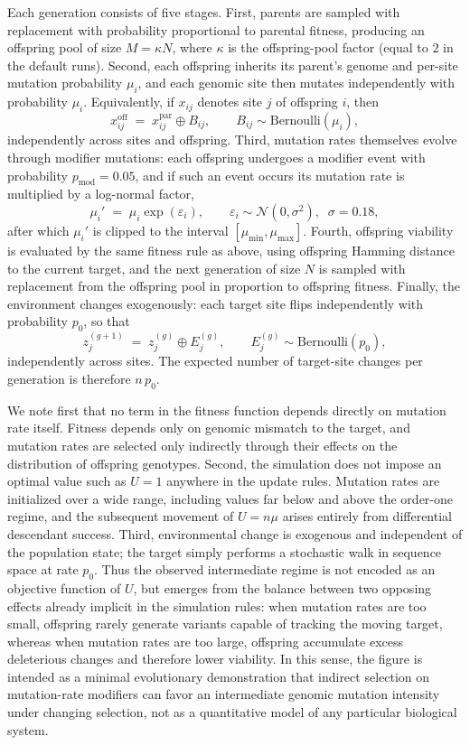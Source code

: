 {Each generation consists of five stages. First, parents are sampled with replacement with probability proportional to parental fitness, producing an offspring pool of size $M=\kappa N$, where $\kappa$ is the offspring-pool factor (equal to $2$ in the default runs). Second, each offspring inherits its parent’s genome and per-site mutation probability $\mu_i$, and each genomic site then mutates independently with probability $\mu_i$. Equivalently, if $x_{ij}$ denotes site $j$ of offspring $i$, then
\[
x_{ij}^{\mathrm{off}} \;=\; x_{ij}^{\mathrm{par}} \oplus B_{ij},
\qquad
B_{ij}\sim \mathrm{Bernoulli}(\mu_i),
\]
independently across sites and offspring. Third, mutation rates themselves evolve through modifier mutations: each offspring undergoes a modifier event with probability $p_{\mathrm{mod}}=0.05$, and if such an event occurs its mutation rate is multiplied by a log-normal factor,
\[
\mu_i' \;=\; \mu_i \exp(\varepsilon_i),
\qquad
\varepsilon_i \sim \mathcal N(0,\sigma^2), \;\; \sigma=0.18,
\]
after which $\mu_i'$ is clipped to the interval $[\mu_{\min},\mu_{\max}]$. Fourth, offspring viability is evaluated by the same fitness rule as above, using offspring Hamming distance to the current target, and the next generation of size $N$ is sampled with replacement from the offspring pool in proportion to offspring fitness. Finally, the environment changes exogenously: each target site flips independently with probability $p_0$, so that
\[
z_j^{(g+1)} \;=\; z_j^{(g)} \oplus E_j^{(g)},
\qquad
E_j^{(g)}\sim \mathrm{Bernoulli}(p_0),
\]
independently across sites. The expected number of target-site changes per generation is therefore $n\,p_0$.

We note first that no term in the fitness function depends directly on mutation rate itself. Fitness depends only on genomic mismatch to the target, and mutation rates are selected only indirectly through their effects on the distribution of offspring genotypes. Second, the simulation does not impose an optimal value such as $U=1$ anywhere in the update rules. Mutation rates are initialized over a wide range, including values far below and above the order-one regime, and the subsequent movement of $U=n\mu$ arises entirely from differential descendant success. Third, environmental change is exogenous and independent of the population state; the target simply performs a stochastic walk in sequence space at rate $p_0$. Thus the observed intermediate regime is not encoded as an objective function of $U$, but emerges from the balance between two opposing effects already implicit in the simulation rules: when mutation rates are too small, offspring rarely generate variants capable of tracking the moving target, whereas when mutation rates are too large, offspring accumulate excess deleterious changes and therefore lower viability. In this sense, the figure is intended as a minimal evolutionary demonstration that indirect selection on mutation-rate modifiers can favor an intermediate genomic mutation intensity under changing selection, not as a quantitative model of any particular biological system.

}
